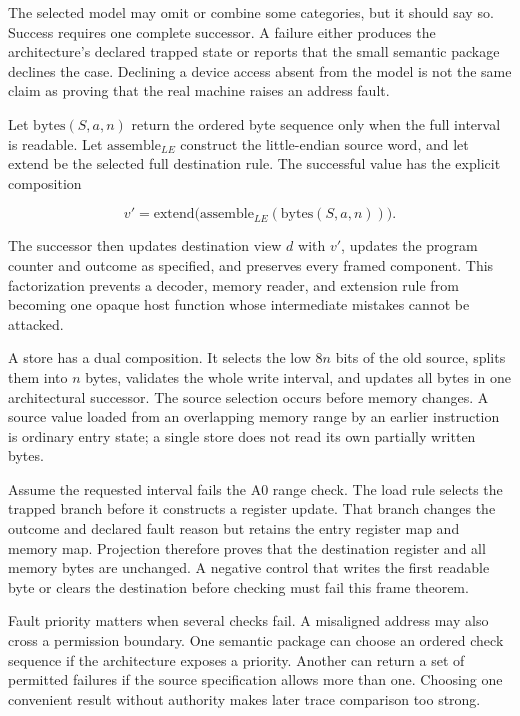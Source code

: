 The selected model may omit or combine some categories, but it should say so.
Success requires one complete successor. A failure either produces the
architecture's declared trapped state or reports that the small semantic
package declines the case. Declining a device access absent from the model is not the
same claim as proving that the real machine raises an address fault.

Let \(\mathrm{bytes}(S,a,n)\) return the ordered byte sequence only when the
full interval is readable. Let \(\mathrm{assemble}_{LE}\) construct the
little-endian source word, and let \(\mathrm{extend}\) be the selected full
destination rule. The successful value has the explicit composition

\[
  v'=\mathrm{extend}
  \bigl(\mathrm{assemble}_{LE}(\mathrm{bytes}(S,a,n))\bigr).
\]

The successor then updates destination view \(d\) with \(v'\), updates the
program counter and outcome as specified, and preserves every framed
component. This factorization prevents a decoder, memory reader, and extension
rule from becoming one opaque host function whose intermediate mistakes
cannot be attacked.

A store has a dual composition. It selects the low \(8n\) bits of the old
source, splits them into \(n\) bytes, validates the whole write interval, and
updates all bytes in one architectural successor. The source selection occurs
before memory changes. A source value loaded from an overlapping memory range
by an earlier instruction is ordinary entry state; a single store does not
read its own partially written bytes.

\begin{proofkit}[title={Failure preserves the destination in A0}]
Assume the requested interval fails the A0 range check. The load rule selects
the trapped branch before it constructs a register update. That branch changes
the outcome and declared fault reason but retains the entry register map and
memory map. Projection therefore proves that the destination register and all
memory bytes are unchanged. A negative control that writes the first readable
byte or clears the destination before checking must fail this frame theorem.
\end{proofkit}

Fault priority matters when several checks fail. A misaligned address may also
cross a permission boundary. One semantic package can choose an ordered check
sequence if the architecture exposes a priority. Another can return a set of
permitted failures if the source specification allows more than one. Choosing
one convenient result without authority makes later trace comparison too
strong.

